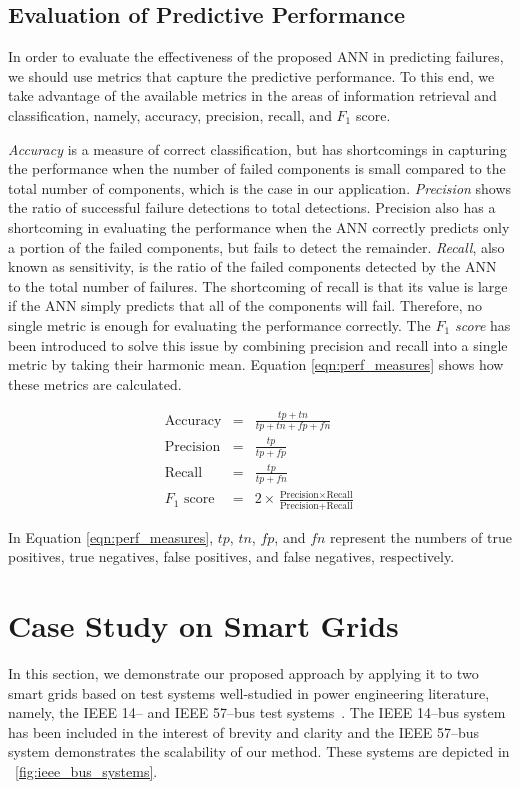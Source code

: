 \documentclass[12pt]{elsarticle}
\begin{document}
\subsection{Evaluation of Predictive Performance}
\label{sec:pred:metrics}
In order to evaluate the effectiveness of the proposed ANN in predicting failures, we should use metrics that capture the predictive performance. To this end, we take advantage of the available metrics in the areas of information retrieval and classification, namely, accuracy, precision, recall, and $F_1$ score.

\emph{Accuracy} is a measure of correct classification, but has shortcomings in capturing the performance when the number of failed components is small compared to the total number of components, which is the case in our application. \emph{Precision} shows the ratio of successful failure detections to total detections. Precision also has a shortcoming in evaluating the performance when the ANN correctly predicts only a portion of the failed components, but fails to detect the remainder. \emph{Recall}, also known as sensitivity, is the ratio of the failed components detected by the ANN to the total number of failures. The shortcoming of recall is that its value is large if the ANN simply predicts that all of the components will fail. Therefore, no single metric is enough for evaluating the performance correctly. The \emph{$F_1$ score} has been introduced to solve this issue by combining precision and recall into a single metric by taking their harmonic mean. Equation \eqref{eqn:perf_measures} shows how these metrics are calculated.

\begin{eqnarray}
\text{Accuracy} &=& \frac{tp + tn}{tp + tn + fp + fn} \nonumber \\
\text{Precision} &=& \frac{tp}{tp + fp} \nonumber \\
\text{Recall} &=& \frac{tp}{tp + fn} \nonumber \\
\text{$F_1$ score} &=& 2 \times \frac{\text{Precision} \times \text{Recall}}{\text{Precision} + \text{Recall}}
\label{eqn:perf_measures}
\end{eqnarray}

In Equation \eqref{eqn:perf_measures}, $tp$, $tn$, $fp$, and $fn$ represent the numbers of true positives, true negatives, false positives, and false negatives, respectively.

\section{Case Study on Smart Grids}
\label{sec:case_study}
In this section, we demonstrate our proposed approach by applying it to two smart grids based on test systems well-studied in power engineering literature, namely, the IEEE 14-- and IEEE 57--bus test systems~\cite{PSTCA}. The IEEE 14--bus system has been included in the interest of brevity and clarity and the IEEE 57--bus system demonstrates the scalability of our method. These systems are depicted in \figurename~\ref{fig:ieee_bus_systems}.
\end{document}
